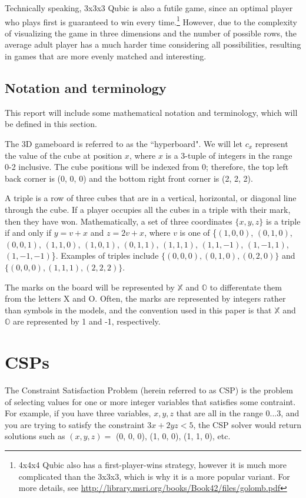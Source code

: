 \documentclass[11pt]{article}
\newcommand{\XX}{$\mathbb{X}$ }
\newcommand{\OO}{$\mathbb{O}$ }
\begin{document}

Technically speaking, 3x3x3 Qubic is also a futile game, since an optimal player who plays first is guaranteed to win every time.\footnote{4x4x4 Qubic also has a first-player-wins strategy, however it is much more complicated than the 3x3x3, which is why it is a more popular variant. For more details, see \url{http://library.msri.org/books/Book42/files/golomb.pdf}} However, due to the complexity of visualizing the game in three dimensions and the number of possible rows, the average adult player has a much harder time considering all possibilities, resulting in games that are more evenly matched and interesting.

\subsection{Notation and terminology}
This report will include some mathematical notation and terminology, which will be defined in this section. 

The 3D gameboard is referred to as the ``hyperboard". We will let $c_{x}$ represent the value of the cube at position $x$, where $x$ is a 3-tuple of integers in the range 0-2 inclusive. The cube positions will be indexed from 0; therefore, the top left back corner is (0, 0, 0) and the bottom right front corner is (2, 2, 2).

A triple is a row of three cubes that are in a vertical, horizontal, or diagonal line through the cube. If a player occupies all the cubes in a triple with their mark, then they have won. Mathematically, a set of three coordinates $\{x, y, z\}$ is a triple if and only if $y = v + x$ and $z = 2v + x$, where $v$ is one of \{$(1, 0, 0)$, $(0, 1, 0)$, $(0, 0, 1)$, $(1, 1, 0)$, $(1, 0, 1)$, $(0, 1, 1)$, $(1, 1, 1)$, $(1, 1, -1)$, $(1, -1, 1)$, $(1, -1, -1)$\}. Examples of triples include $\{(0, 0, 0), (0, 1, 0), (0, 2, 0)\}$ and $\{(0, 0, 0), (1, 1, 1), (2, 2, 2)\}$.

The marks on the board will be represented by \XX and \OO to differentate them from the letters X and O. Often, the marks are represented by integers rather than symbols in the models, and the convention used in this paper is that \XX and \OO are represented by 1 and -1, respectively.



\section{CSPs}
The Constraint Satisfaction Problem (herein referred to as CSP) is the problem of selecting values for one or more integer variables that satisfies some contraint. For example, if you have three variables, $x, y, z$ that are all in the range $0...3$, and you are trying to satisfy the constraint $3x + 2yz < 5$, the CSP solver would return solutions such as $(x,y,z) = $ (0, 0, 0), (1, 0, 0), (1, 1, 0), etc.
\end{document}
